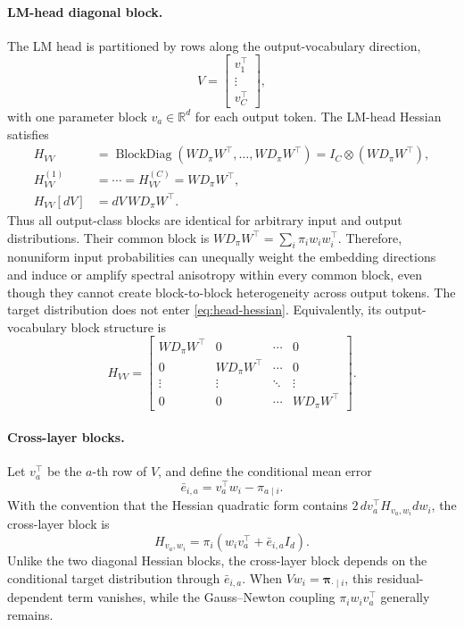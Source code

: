 \documentclass[11pt]{article}
\newcommand{\R}{\mathbb{R}}
\newcommand{\BlockDiag}{\operatorname{BlockDiag}}
\begin{document}
\paragraph{LM-head diagonal block.}
The LM head is partitioned by rows along the output-vocabulary direction,
\begin{equation*}
V=
\begin{bmatrix}
v_1^\top\\
\vdots\\
v_C^\top
\end{bmatrix},
\end{equation*}
with one parameter block \(v_a\in\R^d\) for each output token.  The LM-head
Hessian satisfies
\begin{equation}
\begin{aligned}
H_{VV}
&=\BlockDiag\!\left(
WD_\pi W^\top,\ldots,WD_\pi W^\top
\right)
=I_C\otimes\left(WD_\pi W^\top\right),\\
H_{VV}^{(1)}
&=\cdots=H_{VV}^{(C)}=WD_\pi W^\top,\\
H_{VV}[dV]
&=dV\,WD_\pi W^\top.
\end{aligned}
\label{eq:head-hessian}
\end{equation}
Thus all output-class blocks are identical for arbitrary input and output
distributions.  Their common block is
\(WD_\pi W^\top=\sum_i\pi_iw_iw_i^\top\).  Therefore, nonuniform input
probabilities can unequally weight the embedding directions and induce or
amplify spectral anisotropy within every common block, even though they cannot
create block-to-block heterogeneity across output tokens.  The target
distribution does not enter \eqref{eq:head-hessian}.
Equivalently, its output-vocabulary block structure is
\begin{equation*}
H_{VV}
=
\begin{bmatrix}
WD_\pi W^\top & 0 & \cdots & 0\\
0 & WD_\pi W^\top & \cdots & 0\\
\vdots & \vdots & \ddots & \vdots\\
0 & 0 & \cdots & WD_\pi W^\top
\end{bmatrix}.
\end{equation*}

\paragraph{Cross-layer blocks.}
Let \(v_a^\top\) be the \(a\)-th row of \(V\), and define the conditional mean
error
\begin{equation*}
\bar e_{i,a}=v_a^\top w_i-\pi_{a\mid i}.
\end{equation*}
With the convention that the Hessian quadratic form contains
\(2\,dv_a^\top H_{v_a,w_i}dw_i\), the cross-layer block is
\begin{equation}
H_{v_a,w_i}
=\pi_i\left(w_iv_a^\top+\bar e_{i,a}I_d\right).
\label{eq:cross-block}
\end{equation}
Unlike the two diagonal Hessian blocks, the cross-layer block depends on the
conditional target distribution through \(\bar e_{i,a}\).  When
\(Vw_i=\bm{\pi}_{\cdot\mid i}\), this residual-dependent term vanishes, while
the Gauss--Newton coupling \(\pi_iw_iv_a^\top\) generally remains.
\end{document}
